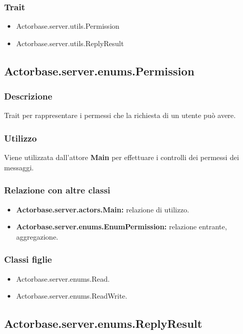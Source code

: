 \documentclass[a4paper]{article}
\begin{document}
			\subsubsection{Trait}
				\begin{itemize}
					\item Actorbase.server.utils.Permission
					\item Actorbase.server.utils.ReplyResult
				\end{itemize}
		
		\subsection{Actorbase.server.enums.Permission}
			\subsubsection{Descrizione}
				Trait per rappresentare i permessi che la richiesta di un utente può avere.
				
			\subsubsection{Utilizzo}
				Viene utilizzata dall'attore \textbf{Main} per effettuare i controlli dei permessi dei messaggi. 				
				
			\subsubsection{Relazione con altre classi}
				\begin{itemize}
					\item \textbf{Actorbase.server.actors.Main:} relazione di utilizzo.
					\item \textbf{Actorbase.server.enums.EnumPermission:} relazione entrante, aggregazione.
				\end{itemize}
				
			\subsubsection{Classi figlie}
				\begin{itemize}
					\item Actorbase.server.enums.Read.
					\item Actorbase.server.enums.ReadWrite.
				\end{itemize}
				
		\subsection{Actorbase.server.enums.ReplyResult}
\end{document}
